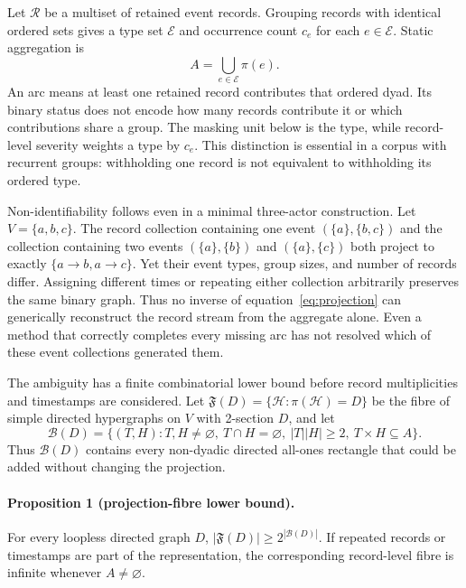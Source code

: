 \documentclass[10pt]{article}
\begin{document}
Let $\mathcal R$ be a multiset of retained event records. Grouping records with identical ordered sets gives a type set $\mathcal E$ and occurrence count $c_e$ for each $e\in\mathcal E$. Static aggregation is
\begin{equation}
A=\bigcup_{e\in\mathcal E}\pi(e).
\label{eq:projection}
\end{equation}
An arc means at least one retained record contributes that ordered dyad. Its binary status does not encode how many records contribute it or which contributions share a group. The masking unit below is the type, while record-level severity weights a type by $c_e$. This distinction is essential in a corpus with recurrent groups: withholding one record is not equivalent to withholding its ordered type.

Non-identifiability follows even in a minimal three-actor construction. Let $V=\{a,b,c\}$. The record collection containing one event $(\{a\},\{b,c\})$ and the collection containing two events $(\{a\},\{b\})$ and $(\{a\},\{c\})$ both project to exactly $\{a\to b,a\to c\}$. Yet their event types, group sizes, and number of records differ. Assigning different times or repeating either collection arbitrarily preserves the same binary graph. Thus no inverse of equation~\eqref{eq:projection} can generically reconstruct the record stream from the aggregate alone. Even a method that correctly completes every missing arc has not resolved which of these event collections generated them.

The ambiguity has a finite combinatorial lower bound before record multiplicities and timestamps are considered. Let $\mathfrak F(D)=\{\mathcal H:\pi(\mathcal H)=D\}$ be the fibre of simple directed hypergraphs on $V$ with 2-section $D$, and let
\begin{equation}
 \mathcal B(D)=\{(T,H):T,H\ne\varnothing,\ T\cap H=\varnothing,\ |T||H|\ge2,\ T\times H\subseteq A\}.
 \label{eq:fibre-bicliques}
\end{equation}
Thus $\mathcal B(D)$ contains every non-dyadic directed all-ones rectangle that could be added without changing the projection.

\paragraph{Proposition 1 (projection-fibre lower bound).}
For every loopless directed graph $D$, $|\mathfrak F(D)|\ge2^{|\mathcal B(D)|}$.  If repeated records or timestamps are part of the representation, the corresponding record-level fibre is infinite whenever $A\ne\varnothing$.
\end{document}

